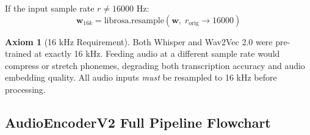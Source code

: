 \documentclass[12pt,a4paper]{article}
\theoremstyle{definition}
\newtheorem{axiom}[theorem]{Axiom}
\theoremstyle{remark}
\begin{document}
If the input sample rate $r \neq 16000$ Hz:
\[
  \mathbf{w}_{16k} =
  \text{librosa.resample}(\mathbf{w},\; r_{\text{orig}} \to 16000)
\]

\begin{axiom}[16 kHz Requirement]
Both Whisper and Wav2Vec 2.0 were pre-trained at exactly 16 kHz.
Feeding audio at a different sample rate would compress or stretch phonemes,
degrading both transcription accuracy and audio embedding quality.
All audio inputs \emph{must} be resampled to 16 kHz before processing.
\end{axiom}

\subsection{AudioEncoderV2 Full Pipeline Flowchart}
\end{document}
